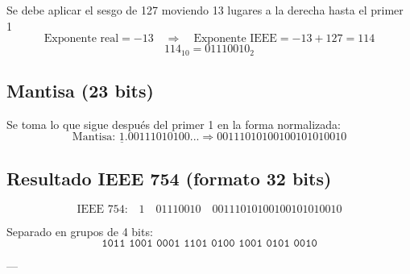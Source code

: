 \documentclass[a4paper,12pt]{article}
\begin{document}
\begin{center}
		Se debe aplicar el sesgo de 127 moviendo 13 lugares a la derecha hasta el primer 1
		\vspace{-0.5em}
		\[
		\text{Exponente real} = -13 \quad \Rightarrow \quad \text{Exponente IEEE} = -13 + 127 = 114
		\]
		\vspace{-0.5em}
		\[
		114_{10} = 01110010_2
		\]
		
		\subsection*{Mantisa (23 bits)}
		
		Se toma lo que sigue después del primer 1 en la forma normalizada:
		\vspace{-0.5em}
		\[
		\text{Mantisa: } \underline{1}.00111010100... \Rightarrow 00111010100100101010010
		\]
		
		\subsection*{Resultado IEEE 754 (formato 32 bits)}
		
		\[
		\text{IEEE 754:} \quad 
		\boxed{1} \quad \boxed{01110010} \quad \boxed{00111010100100101010010}
		\]

		Separado en grupos de 4 bits:
		\vspace{-0.5em}
		\[
		\texttt{1011\ 1001\ 0001\ 1101\ 0100\ 1001\ 0101\ 0010}
		\]
		
		---	
		\end{center}
\end{document}
